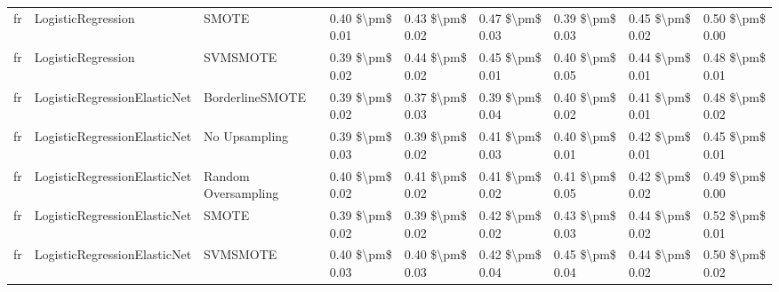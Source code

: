 \begin{tabular}{lllllllll}
      fr &              LogisticRegression &                         SMOTE & 0.40 \$\textbackslash pm\$ 0.01 &           0.43 \$\textbackslash pm\$ 0.02 &       0.47 \$\textbackslash pm\$ 0.03 &        0.39 \$\textbackslash pm\$ 0.03 &                         0.45 \$\textbackslash pm\$ 0.02 &     0.50 \$\textbackslash pm\$ 0.00 \\
      fr &              LogisticRegression &                      SVMSMOTE & 0.39 \$\textbackslash pm\$ 0.02 &           0.44 \$\textbackslash pm\$ 0.02 &       0.45 \$\textbackslash pm\$ 0.01 &        0.40 \$\textbackslash pm\$ 0.05 &                         0.44 \$\textbackslash pm\$ 0.01 &     0.48 \$\textbackslash pm\$ 0.01 \\
      fr &    LogisticRegressionElasticNet &               BorderlineSMOTE & 0.39 \$\textbackslash pm\$ 0.02 &           0.37 \$\textbackslash pm\$ 0.03 &       0.39 \$\textbackslash pm\$ 0.04 &        0.40 \$\textbackslash pm\$ 0.02 &                         0.41 \$\textbackslash pm\$ 0.01 &     0.48 \$\textbackslash pm\$ 0.02 \\
      fr &    LogisticRegressionElasticNet &                 No Upsampling & 0.39 \$\textbackslash pm\$ 0.03 &           0.39 \$\textbackslash pm\$ 0.02 &       0.41 \$\textbackslash pm\$ 0.03 &        0.40 \$\textbackslash pm\$ 0.01 &                         0.42 \$\textbackslash pm\$ 0.01 &     0.45 \$\textbackslash pm\$ 0.01 \\
      fr &    LogisticRegressionElasticNet &           Random Oversampling & 0.40 \$\textbackslash pm\$ 0.02 &           0.41 \$\textbackslash pm\$ 0.02 &       0.41 \$\textbackslash pm\$ 0.02 &        0.41 \$\textbackslash pm\$ 0.05 &                         0.42 \$\textbackslash pm\$ 0.02 &     0.49 \$\textbackslash pm\$ 0.00 \\
      fr &    LogisticRegressionElasticNet &                         SMOTE & 0.39 \$\textbackslash pm\$ 0.02 &           0.39 \$\textbackslash pm\$ 0.02 &       0.42 \$\textbackslash pm\$ 0.02 &        0.43 \$\textbackslash pm\$ 0.03 &                         0.44 \$\textbackslash pm\$ 0.02 &     0.52 \$\textbackslash pm\$ 0.01 \\
      fr &    LogisticRegressionElasticNet &                      SVMSMOTE & 0.40 \$\textbackslash pm\$ 0.03 &           0.40 \$\textbackslash pm\$ 0.03 &       0.42 \$\textbackslash pm\$ 0.04 &        0.45 \$\textbackslash pm\$ 0.04 &                         0.44 \$\textbackslash pm\$ 0.02 &     0.50 \$\textbackslash pm\$ 0.02 \\

\end{tabular}
